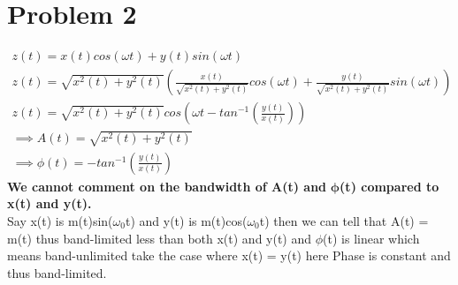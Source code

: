 \documentclass{article}
\begin{document}
\section*{\hfil Problem 2}
\begin{gather}
	z(t) = x(t)cos({\omega}t) + y(t)sin({\omega}t)\\
	z(t) = \sqrt{x^2(t) + y^2(t)}\left(\frac{x(t)}{\sqrt{x^2(t) + y^2(t)}}cos({\omega}t) + \frac{y(t)}{\sqrt{x^2(t) + y^2(t)}}sin({\omega}t)\right)\\
	z(t) = \sqrt{x^2(t) + y^2(t)}cos({\omega}t - tan^{-1}\left(\frac{y(t)}{x(t)}\right))\\
	\implies A(t) = \sqrt{x^2(t) + y^2(t)}\\
	\implies \phi(t) = - tan^{-1}\left(\frac{y(t)}{x(t)}\right)
\end{gather}
\textbf{We cannot comment on the bandwidth of A(t) and} $\mathbf{\phi}$\textbf{(t) compared to x(t) and y(t).}\\
Say x(t) is m(t)sin($\omega _0$t) and y(t) is  m(t)cos($\omega _0$t) then we can tell that A(t) = m(t) thus band-limited less than both x(t) and y(t) and $\phi$(t) is linear which means band-unlimited take the case where x(t) = y(t) here Phase is constant and thus band-limited.
\end{document}
